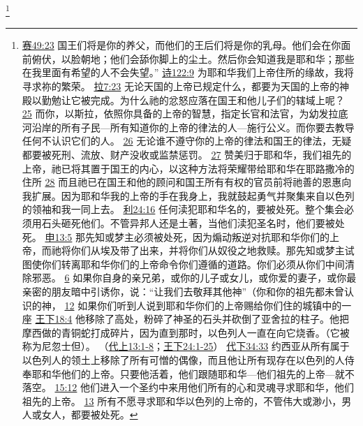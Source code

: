 \documentclass[12pt, a4paper, oneside]{ctexart}
\begin{document}
	\footnote {
		\href{https://biblehub.com/isaiah/49-23.htm}{赛49:23} 国王们将是你的养父，而他们的王后们将是你的乳母。他们会在你面前俯伏，以脸朝地；他们会舔你脚上的尘土。然后你会知道我是耶和华；那些在我里面有希望的人不会失望。”
		\href{https://biblehub.com/psalms/122-9.htm}{诗122:9} 为耶和华我们上帝住所的缘故，我将寻求祢的繁荣。
		\href{https://biblehub.com/ezra/7-23.htm}{拉7:23} 无论天国的上帝已规定什么，都要为天国的上帝的神殿以勤勉让它被完成。为什么祂的忿怒应落在国王和他儿子们的辖域上呢？
		\href{https://biblehub.com/ezra/7-25.htm}{25} 而你，以斯拉，依照你具备的上帝的智慧，指定长官和法官，为幼发拉底河沿岸的所有子民---所有知道你的上帝的律法的人---施行公义。而你要去教导任何不认识它们的人。
		\href{https://biblehub.com/ezra/7-26.htm}{26} 无论谁不遵守你的上帝的律法和国王的律法，无疑都要被死刑、流放、财产没收或监禁惩罚。
		\href{https://biblehub.com/ezra/7-27.htm}{27} 赞美归于耶和华，我们祖先的上帝，祂已将其置于国王的内心，以这种方法将荣耀带给耶和华在耶路撒冷的住所
		\href{https://biblehub.com/ezra/7-28.htm}{28} 而且祂已在国王和他的顾问和国王所有有权的官员前将祂善的恩惠向我扩展。因为耶和华我的上帝的手在我身上，我就鼓起勇气并聚集来自以色列的领袖和我一同上去。
		\href{https://biblehub.com/leviticus/24-16.htm}{利24:16} 任何渎犯耶和华名的，要被处死。整个集会必须用石头砸死他们。不管异邦人还是土著，当他们渎犯圣名时，他们要被处死。
		\href{https://biblehub.com/deuteronomy/13-5.htm}{申13:5} 那先知或梦主必须被处死，因为煽动叛逆对抗耶和华你们的上帝，而祂将你们从埃及带了出来，并将你们从奴役之地救赎。那先知或梦主试图使你们转离耶和华你们的上帝命令你们遵循的道路。你们必须从你们中间清除邪恶。
		\href{https://biblehub.com/deuteronomy/13-6.htm}{6} 如果你自身的亲兄弟，或你的儿子或女儿，或你爱的妻子，或你最亲密的朋友暗中引诱你，说：“让我们去敬拜其他神”（你和你的祖先都未曾认识的神，
		\href{https://biblehub.com/deuteronomy/13-12.htm}{12} 如果你们听到人说到耶和华你们的上帝赐给你们住的城镇中的一座
		\href{https://biblehub.com/2_kings/18-4.htm}{王下18:4} 他移除了高处，粉碎了神圣的石头并砍倒了亚舍拉的柱子。他把摩西做的青铜蛇打成碎片，因为直到那时，以色列人一直在向它烧香。（它被称为尼忽士但）。
		（\href{https://biblehub.com/niv/1_chronicles/13.htm}{代上13:1-8}；\href{https://biblehub.com/niv/2_kings/24.htm}{王下24:1-25}） 
		\href{https://biblehub.com/2_chronicles/34-33.htm}{代下34:33} 约西亚从所有属于以色列人的领土上移除了所有可憎的偶像，而且他让所有现存在以色列的人侍奉耶和华他们的上帝。只要他活着，他们跟随耶和华---他们祖先的上帝---就不落空。
		\href{https://biblehub.com/2_chronicles/15-12.htm}{15:12} 他们进入一个圣约中来用他们所有的心和灵魂寻求耶和华，他们祖先的上帝。
		\href{https://biblehub.com/2_chronicles/15-13.htm}{13} 所有不愿寻求耶和华以色列的上帝的，不管伟大或渺小，男人或女人，都要被处死。
	}
\end{document}
